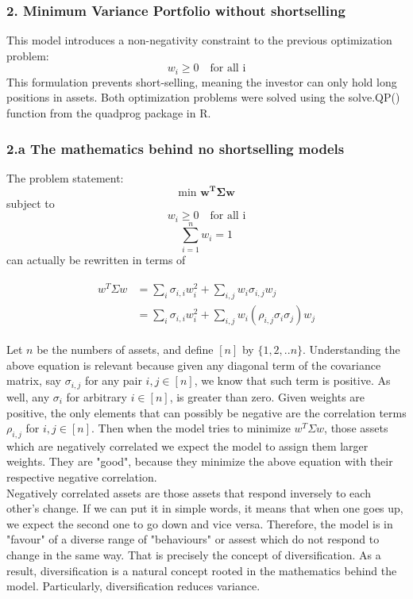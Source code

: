\documentclass[12pt]{article}
\begin{document}
\subsubsection*{2. Minimum Variance Portfolio without shortselling}
This model introduces a non-negativity constraint to the previous optimization problem:
\[w_i \geq 0 \quad \text{for all i}\]
This formulation prevents short-selling, meaning the investor can only hold long positions in assets.\newline
Both optimization problems were solved using the solve.QP() function from the quadprog package in R.

\subsubsection*{2.a The mathematics behind no shortselling models}
The problem statement:
\[\text{min } \mathbf{w^T\Sigma w}\]
subject to 
\[w_i \geq 0 \quad \text{for all i}\]
\[\sum_{i=1}^n w_i=1\]
can actually be rewritten in terms of 

\begin{align*}
\begin{split}
w^T \Sigma w 
&= \sum_{i} {\sigma_{i,i} w_i^2} + \sum_{i,j} {w_i \sigma_{i,j} w_j} \\
&= \sum_{i} {\sigma_{i,i} w_i^2} + \sum_{i,j} {w_i \left (\rho_{i,j}  \sigma_i  \sigma_j \right) w_j}
\end{split}
\end{align*}

Let $n$ be the numbers of assets, and define $[n]$ by $\{1,2,..n\}$.
Understanding the above equation is relevant because given any diagonal term of the covariance matrix, say $\sigma_{i,j}$ for any pair ${i,j} \in[n]$, we know that such term is positive. As well, any $\sigma_{i}$ for arbitrary ${i} \in[n]$, is greater than zero. Given weights are positive, the only elements that can possibly be negative are the correlation terms $\rho_{i,j}$ for ${i,j} \in[n]$. Then when the model tries to minimize $w^T \Sigma w $, those assets which are negatively correlated we expect the model to assign them larger weights. They are "good", because they minimize the above equation with their respective negative correlation.\\

Negatively correlated assets are those assets that respond inversely to each other's change. If we can put it in simple words, it means that when one goes up, we expect the second one to go down and vice versa. Therefore, the model is in "favour" of a diverse range of "behaviours" or assest which do not respond to change in the same way. That is precisely the concept of diversification. As a result, diversification is a natural concept rooted in the mathematics behind the model. Particularly, diversification reduces variance.
\end{document}
